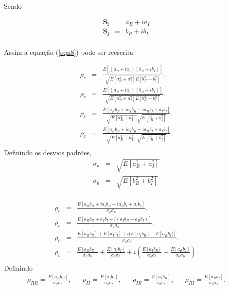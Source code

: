 \documentclass[12pt,a4paper]{article}
\begin{document}
Sendo 

\begin{equation}\label{eqn11}
\begin{array}{ccc}
	\mathbf{S_i}&=&a_{R}+ia_{I} \\
        \mathbf{S_j}&=&b_{R}+ib_{I} \\
\end{array}
\end{equation}

Assim a equação (\ref{eqn8}) pode ser reescrita

\begin{equation}\label{eqn12}
\begin{array}{ccc}
	\rho_c&=&\frac{E[(a_{R}+ia_{I})\overline{(b_{R}+ib_{I})}]}{\sqrt{E[a_{R}^2+a_{I}^2]E[b_{R}^2+b_{I}^2]}}. \\
	\rho_c&=&\frac{E[(a_{R}+ia_{I})(b_{R}-ib_{I})]}{\sqrt{E[a_{R}^2+a_{I}^2]E[b_{R}^2+b_{I}^2]}}. \\
	\rho_c&=&\frac{E[a_{R}b_{R}+ia_{I}b_{R}-ia_{R}b_{I}+a_{I}b_{I}]}{\sqrt{E[a_{R}^2+a_{I}^2]}\sqrt{E[b_{R}^2+b_{I}^2]}}. \\
	\rho_c&=&\frac{E[a_{R}b_{R}+ia_{I}b_{R}-ia_{R}b_{I}+a_{I}b_{I}]}{\sqrt{E[a_{R}^2+a_{I}^2]}\sqrt{E[b_{R}^2+b_{I}^2]}}. \\
\end{array}
\end{equation}
Definindo os desvios padrões,
\begin{equation}\label{eqn13}
\begin{array}{ccc}
	\sigma_{a}	&=&\sqrt{E[a_{R}^2+a_{I}^2]} \\
	\sigma_{b}      &=&\sqrt{E[b_{R}^2+b_{I}^2]} \\
\end{array}
\end{equation}

\begin{equation}\label{eqn14}
\begin{array}{ccc}
	\rho_c&=&\frac{E[a_{R}b_{R}+ia_{I}b_{R}-ia_{R}b_{I}+a_{I}b_{I}]}{\sigma_a\sigma_b}. \\
	\rho_c&=&\frac{E[a_{R}b_{R}+a_{I}b_{I}+i(a_{I}b_{R}-a_{R}b_{I})]}{\sigma_a\sigma_b}. \\
	\rho_c&=&\frac{E[a_{R}b_{R}]+E[a_{I}b_{I}]+i(E[a_{I}b_{R}]-E[a_{R}b_{I})]}{\sigma_a\sigma_b}. \\
	\rho_c&=&\frac{E[a_{R}b_{R}]}{\sigma_a\sigma_b}+\frac{E[a_{I}b_{I}]}{\sigma_a\sigma_b}+i\left(\frac{E[a_{I}b_{R}]}{\sigma_a\sigma_b}-\frac{E[a_{R}b_{I}]}{\sigma_a\sigma_b}\right). \\
\end{array}
\end{equation}
Definindo
\begin{equation}\label{eqn15}
\begin{array}{ccccccccc}
	\rho_{RR}=\frac{E[a_{R}b_{R}]}{\sigma_a\sigma_b},&&\rho_{II}=\frac{E[a_{I}b_{I}]}{\sigma_a\sigma_b},&&\rho_{IR}=\frac{E[a_{I}b_{R}]}{\sigma_a\sigma_b},&&\rho_{RI}=\frac{E[a_{R}b_{I}]}{\sigma_a\sigma_b}. \\
\end{array}
\end{equation}
\end{document}
